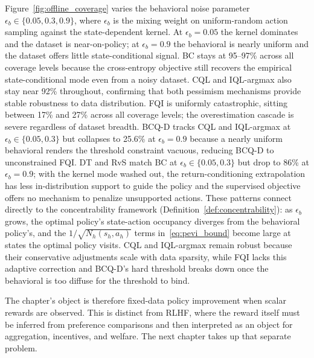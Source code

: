 Figure~\ref{fig:offline_coverage} varies the behavioral noise parameter $\epsilon_b \in \{0.05, 0.3, 0.9\}$, where $\epsilon_b$ is the mixing weight on uniform-random action sampling against the state-dependent kernel. At $\epsilon_b = 0.05$ the kernel dominates and the dataset is near-on-policy; at $\epsilon_b = 0.9$ the behavioral is nearly uniform and the dataset offers little state-conditional signal. BC stays at 95--97\% across all coverage levels because the cross-entropy objective still recovers the empirical state-conditional mode even from a noisy dataset. CQL and IQL-argmax also stay near 92\% throughout, confirming that both pessimism mechanisms provide stable robustness to data distribution. FQI is uniformly catastrophic, sitting between 17\% and 27\% across all coverage levels; the overestimation cascade is severe regardless of dataset breadth. BCQ-D tracks CQL and IQL-argmax at $\epsilon_b \in \{0.05, 0.3\}$ but collapses to 25.6\% at $\epsilon_b = 0.9$ because a nearly uniform behavioral renders the threshold constraint vacuous, reducing BCQ-D to unconstrained FQI. DT and RvS match BC at $\epsilon_b \in \{0.05, 0.3\}$ but drop to 86\% at $\epsilon_b = 0.9$; with the kernel mode washed out, the return-conditioning extrapolation has less in-distribution support to guide the policy and the supervised objective offers no mechanism to penalize unsupported actions. These patterns connect directly to the concentrability framework (Definition~\ref{def:concentrability}): as $\epsilon_b$ grows, the optimal policy's state-action occupancy diverges from the behavioral policy's, and the $1/\sqrt{N_h(s_h, a_h)}$ terms in~\eqref{eq:pevi_bound} become large at states the optimal policy visits. CQL and IQL-argmax remain robust because their conservative adjustments scale with data sparsity, while FQI lacks this adaptive correction and BCQ-D's hard threshold breaks down once the behavioral is too diffuse for the threshold to bind.

The chapter's object is therefore fixed-data policy improvement when scalar rewards are observed. This is distinct from RLHF, where the reward itself must be inferred from preference comparisons and then interpreted as an object for aggregation, incentives, and welfare. The next chapter takes up that separate problem.
